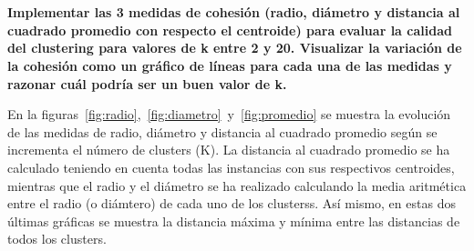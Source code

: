 \documentclass[11pt,a4paper]{article}
\begin{document}
 
\pagestyle{fancy}
\fancyhf{}
\rfoot{\thepage\ / \pageref{LastPage}}
\renewcommand{\headrulewidth}{0.4pt}
\renewcommand{\footrulewidth}{0.4pt}
\section*{}

\textbf{Implementar las 3 medidas de cohesión (radio, diámetro y distancia al
cuadrado promedio con respecto el centroide) para evaluar la calidad del
clustering para valores de k entre 2 y 20. Visualizar la variación de la
cohesión como un gráfico de líneas para cada una de las medidas y razonar
cuál podría ser un buen valor de k.}


En la figuras~\ref{fig:radio},~\ref{fig:diametro}~y~\ref{fig:promedio} se
muestra la evolución de las medidas de radio, diámetro y distancia al
cuadrado promedio según se incrementa el número de clusters (K). La
distancia al cuadrado promedio se ha calculado teniendo en cuenta todas las
instancias con sus respectivos centroides, mientras que el radio y el
diámetro se ha realizado calculando la media aritmética entre el radio (o
diámtero) de cada uno de los clusterss. Así mismo, en estas dos últimas
gráficas se muestra la distancia máxima y mínima entre las distancias de
todos los clusters.
\end{document}
